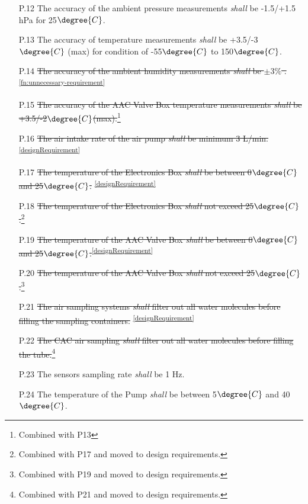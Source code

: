 \documentclass[a4paper,12pt,oneside]{article}
\begin{document}
\begin{appendices}
\begin{enumerate}
    \item[P.12] The accuracy of the ambient pressure measurements \textit{shall} be -1.5/+1.5 hPa for 25$\degree{C}$.
    \item[P.13] The accuracy of temperature measurements \textit{shall} be +3.5/-3$\degree{C}$ (max) for condition of -55$\degree{C}$ to 150$\degree{C}$.
    \item[P.14] \st{The accuracy of the ambient humidity measurements \textit{shall} be $\pm 3\%$ .} \cite{Humiditysensor}\textsuperscript{\ref{fn:unnecessary-requirement}}
    \item[P.15] \st{The accuracy of the AAC Valve Box temperature measurements \textit{shall} be +3.5/-2$\degree{C}$(max).}\footnote{Combined with P13\label{fn:combi-p13}}
    \item[P.16] \st{The air intake rate of the air pump \textit{shall} be minimum 3 L/min.}\textsuperscript{\ref{designRequirement}}
    \item[P.17] \st{The temperature of the Electronics Box \textit{shall} be between 0$\degree{C}$ and 25$\degree{C}$.} \textsuperscript{\ref{designRequirement}}
    \item[P.18] \st{The temperature of the Electronics Box \textit{shall} not exceed 25$\degree{C}$.}\footnote{Combined with P17 and moved to design requirements.\label{fn:combi-p17}}
    \item[P.19] \st{The temperature of the AAC Valve Box \textit{shall} be between 0$\degree{C}$ and 25$\degree{C}$.}\textsuperscript{\ref{designRequirement}}
    \item[P.20] \st{The temperature of the AAC Valve Box \textit{shall} not exceed 25$\degree{C}$.}\footnote{Combined with P19 and moved to design requirements.\label{fn:combi-p19}}
    \item[P.21] \st{The air sampling systems \textit{shall} filter out all water molecules before filling the sampling containers.} \textsuperscript{\ref{designRequirement}}
    \item[P.22] \st{The CAC air sampling \textit{shall} filter out all water molecules before filling the tube.}\footnote{Combined with P21 and moved to design requirements.\label{fn:combi-p21}}
    \item[P.23] The sensors sampling rate \textit{shall} be 1 Hz.
    \item[P.24] The temperature of the Pump \textit{shall} be between 5$\degree{C}$ and 40$\degree{C}$. 

\end{enumerate}
\end{appendices}
\end{document}
